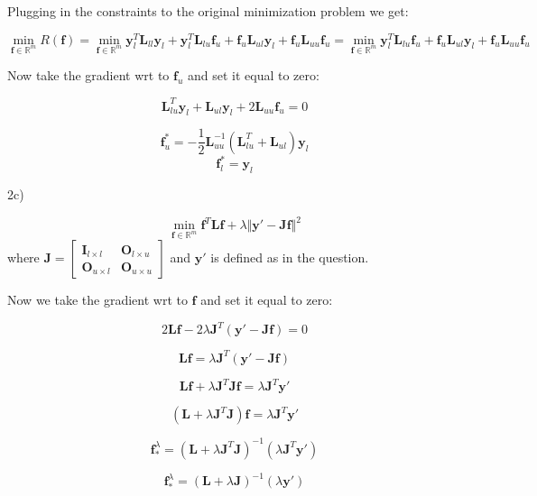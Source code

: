 \documentclass[12pt]{report}
\begin{document}
Plugging in the constraints to the original minimization problem we get:

$$ \underset{\mathbf{f} \in \mathbb{R}^m} {\min} R(\mathbf{f}) = 
\underset{\mathbf{f} \in \mathbb{R}^m} {\min} 
\mathbf{y}^T_l\mathbf{L}_{ll}\mathbf{y}_l
+
\mathbf{y}^T_l\mathbf{L}_{lu}\mathbf{f}_u
+
\mathbf{f}_u\mathbf{L}_{ul}\mathbf{y}_l
+
\mathbf{f}_u\mathbf{L}_{uu}\mathbf{f}_u
=
\underset{\mathbf{f} \in \mathbb{R}^m} {\min}
\mathbf{y}^T_l\mathbf{L}_{lu}\mathbf{f}_u
+
\mathbf{f}_u\mathbf{L}_{ul}\mathbf{y}_l
+
\mathbf{f}_u\mathbf{L}_{uu}\mathbf{f}_u
$$

Now take the gradient wrt to $\mathbf{f}_u$ and set it equal to zero:

$$
\mathbf{L}_{lu}^T\mathbf{y}_l
+
\mathbf{L}_{ul}\mathbf{y}_l
+
2\mathbf{L}_{uu}\mathbf{f}_u = 0
$$


$$
\boxed{
\mathbf{f}^*_{u} = -\frac{1}{2} \mathbf{L}_{uu}^{-1} (\mathbf{L}_{lu}^T+\mathbf{L}_{ul})\mathbf{y}_{l}
}
$$
$$
\boxed{
\mathbf{f}^*_{l} = \mathbf{y}_{l}
}
$$

2c)

\begin{equation}
 \underset{\mathbf{f} \in \mathbb{R}^m} {\min}
 \mathbf{f}^T\mathbf{L}\mathbf{f}
+ \lambda
%
\Vert \mathbf{y'} - \mathbf{J} \mathbf{f} \Vert^2
%
\end{equation}
where $ \mathbf{J} = \begin{bmatrix} \mathbf{I}_{l \times l} & \mathbf{O}_{l \times u} \\ \mathbf{O}_{u \times l} & \mathbf{O}_{u \times u} \end{bmatrix}$ and $\mathbf{y'}$ is defined as in the question.

Now we take the gradient wrt to $\mathbf{f}$ and set it equal to zero:

$$2\mathbf{L}\mathbf{f} - 2 \lambda \mathbf{J}^T(\mathbf{y'} -\mathbf{J}\mathbf{f}) = 0$$

$$\mathbf{L}\mathbf{f} = \lambda \mathbf{J}^T(\mathbf{y'} -\mathbf{J}\mathbf{f})$$

$$\mathbf{L}\mathbf{f} +\lambda \mathbf{J}^T  \mathbf{J}\mathbf{f} = \lambda \mathbf{J}^T\mathbf{y'}$$

$$(\mathbf{L}+\lambda \mathbf{J}^T  \mathbf{J} )\mathbf{f} = \lambda \mathbf{J}^T\mathbf{y'}$$

$$\mathbf{f}_*^{\lambda} = ( \mathbf{L}+ \lambda \mathbf{J}^T \mathbf{J} )^{-1} (\lambda \mathbf{J}^T\mathbf{y'})$$

$$
\boxed{
\mathbf{f}_*^{\lambda} = ( \mathbf{L}+ \lambda \mathbf{J} )^{-1} (\lambda \mathbf{y'})
}
$$
\end{document}
